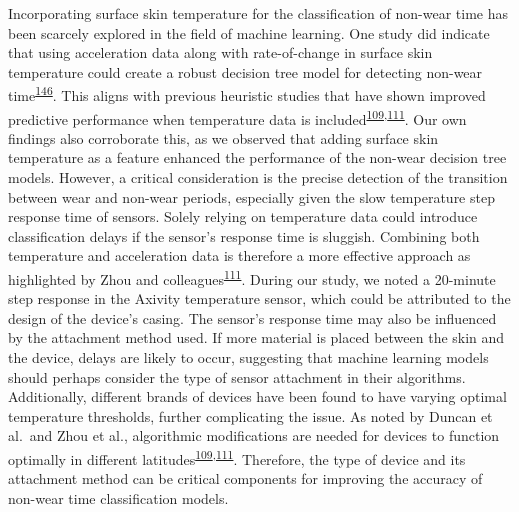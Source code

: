 \documentclass[
  10pt,
]{scrbook}
\begin{document}
Incorporating surface skin temperature for the classification of
non-wear time has been scarcely explored in the field of machine
learning. One study did indicate that using acceleration data along with
rate-of-change in surface skin temperature could create a robust
decision tree model for detecting non-wear
time\textsuperscript{\protect\hyperlink{ref-vert_detecting_2022}{146}}.
This aligns with previous heuristic studies that have shown improved
predictive performance when temperature data is
included\textsuperscript{\protect\hyperlink{ref-duncan_wear-time_2018}{109},\protect\hyperlink{ref-zhou_classification_2015}{111}}.
Our own findings also corroborate this, as we observed that adding
surface skin temperature as a feature enhanced the performance of the
non-wear decision tree models. However, a critical consideration is the
precise detection of the transition between wear and non-wear periods,
especially given the slow temperature step response time of sensors.
Solely relying on temperature data could introduce classification delays
if the sensor's response time is sluggish. Combining both temperature
and acceleration data is therefore a more effective approach as
highlighted by Zhou and
colleagues\textsuperscript{\protect\hyperlink{ref-zhou_classification_2015}{111}}.
During our study, we noted a 20-minute step response in the Axivity
temperature sensor, which could be attributed to the design of the
device's casing. The sensor's response time may also be influenced by
the attachment method used. If more material is placed between the skin
and the device, delays are likely to occur, suggesting that machine
learning models should perhaps consider the type of sensor attachment in
their algorithms. Additionally, different brands of devices have been
found to have varying optimal temperature thresholds, further
complicating the issue. As noted by Duncan et al.~and Zhou et al.,
algorithmic modifications are needed for devices to function optimally
in different
latitudes\textsuperscript{\protect\hyperlink{ref-duncan_wear-time_2018}{109},\protect\hyperlink{ref-zhou_classification_2015}{111}}.
Therefore, the type of device and its attachment method can be critical
components for improving the accuracy of non-wear time classification
models.
\end{document}
